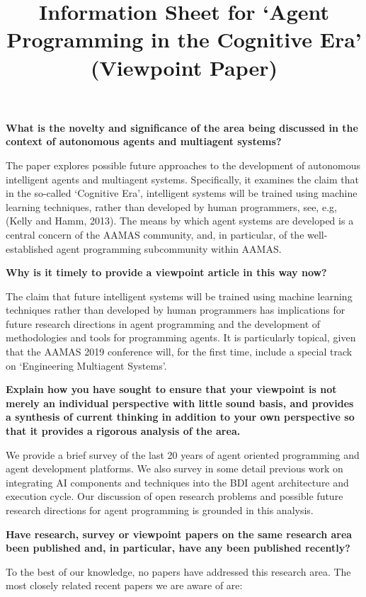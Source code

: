 \documentclass[11pt]{article}
\title{Information Sheet for `Agent Programming in the Cognitive Era' (Viewpoint Paper)}
\date{}
\begin{document}
\maketitle

\noindent\textbf{What is the novelty and significance of the area being discussed in the context of autonomous agents and multiagent systems?}

The paper explores possible future approaches to the development of autonomous intelligent agents and multiagent systems. Specifically, it examines the claim that in the so-called `Cognitive Era', intelligent systems will be trained using machine learning techniques, rather than developed by human programmers, see, e.g, (Kelly and Hamm, 2013). The means by which agent systems are developed is a central concern of the AAMAS community, and, in particular, of the well-established agent programming subcommunity within AAMAS.

\medskip\noindent\textbf{Why is it timely to provide a viewpoint article in this way now?}

The claim that future intelligent systems will be trained using machine learning techniques rather than developed by human programmers has implications for future research directions in agent programming and the development of methodologies and tools for programming agents. It is particularly topical, given that the AAMAS 2019 conference will, for the first time, include a special track on `Engineering Multiagent Systems'.

\medskip\noindent\textbf{Explain how you have sought to ensure that your viewpoint is not merely an individual perspective with little sound basis, and provides a synthesis of current thinking in addition to your own perspective so that it provides a rigorous analysis of the area.}

We provide a brief survey of the last 20 years of agent oriented programming and agent development platforms. We also survey in some detail previous work on integrating AI components and techniques into the BDI agent architecture and execution cycle. Our discussion of open research problems and possible future research directions for agent programming is grounded in this analysis.

\medskip\noindent\textbf{Have research, survey or viewpoint papers on the same research area been published and, in particular, have any been published recently?}

To the best of our knowledge, no papers have addressed this research area. 
%
The most closely related recent papers we are aware of are:
\end{document}
